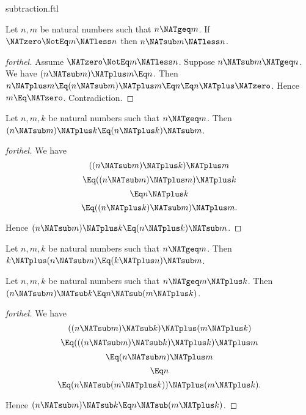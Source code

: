\documentclass{stex}
\begin{document}
\begin{smodule}{subtraction.ftl}
\begin{proposition}[forthel]
  Let $n, m$ be natural numbers such that $n \NATgeq m$.
  If $\NATzero \NotEq m \NATless n$ then $n \NATsub m \NATless n$.
\end{proposition}
\begin{proof}[forthel]
  Assume $\NATzero \NotEq m \NATless n$.
  Suppose $n \NATsub m \NATgeq n$.
  We have $(n \NATsub m) \NATplus m \Eq n$.
  Then $n \NATplus m
    \Eq (n \NATsub m) \NATplus m
    \Eq n
    \Eq n \NATplus \NATzero$.
  Hence $m \Eq \NATzero$.
  Contradiction.
\end{proof}

\begin{proposition}[forthel]
  Let $n, m, k$ be natural numbers such that $n \NATgeq m$.
  Then $(n \NATsub m) \NATplus k \Eq (n \NATplus k) \NATsub m$.
\end{proposition}
\begin{proof}[forthel]
  We have
  \[  ((n \NATsub m) \NATplus k) \NATplus m       \]
  \[    \Eq ((n \NATsub m) \NATplus m) \NATplus k   \]
  \[    \Eq n \NATplus k               \]
  \[    \Eq ((n \NATplus k) \NATsub m) \NATplus m.  \]

  Hence $(n \NATsub m) \NATplus k \Eq (n \NATplus k) \NATsub m$.
\end{proof}


\begin{corollary}[forthel,name=associativity of addition and subtraction]
  Let $n, m, k$ be natural numbers such that $n \NATgeq m$.
  Then $k \NATplus (n \NATsub m) \Eq (k \NATplus n) \NATsub m$.
\end{corollary}

\begin{proposition}[forthel]
  Let $n, m, k$ be natural numbers such that $n \NATgeq  m \NATplus k$.
  Then $(n \NATsub m) \NATsub k \Eq n \NATsub (m \NATplus k)$.
\end{proposition}
\begin{proof}[forthel]
  We have
  \[  ((n \NATsub m) \NATsub k) \NATplus (m \NATplus k)       \]
  \[    \Eq (((n \NATsub m) \NATsub k) \NATplus k) \NATplus m   \]
  \[    \Eq (n \NATsub m) \NATplus m               \]
  \[    \Eq n                         \]
  \[    \Eq (n \NATsub (m \NATplus k)) \NATplus (m \NATplus k).  \]

  Hence $(n \NATsub m) \NATsub k \Eq n \NATsub (m \NATplus k)$.
\end{proof}
\end{smodule}
\end{document}
